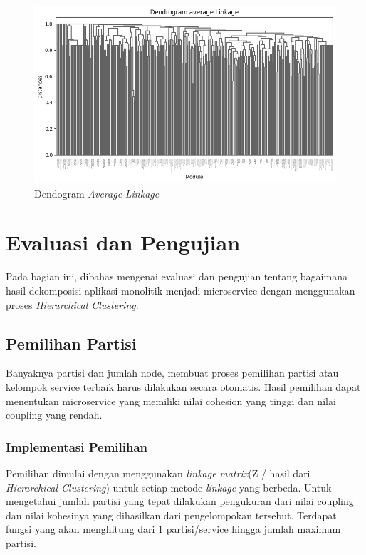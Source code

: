 \begin{figure}[htbp]
	\centering
	\begin{minipage}{1\textwidth}
		\centering
		\includegraphics[width=1\textwidth]{img/bab_4/avg_dd.png}
		\caption{Dendogram \textit{Average} \textit{Linkage} }
		\label{fig:dd_avg}
	\end{minipage}\hfill	
\end{figure}

\pagebreak


\section{Evaluasi dan Pengujian}
Pada bagian ini, dibahas mengenai evaluasi dan pengujian tentang bagaimana hasil dekomposisi aplikasi monolitik menjadi microservice dengan menggunakan proses \textit{Hierarchical Clustering}.

\subsection{Pemilihan Partisi}
Banyaknya partisi dan jumlah node, membuat proses pemilihan partisi atau kelompok service terbaik harus dilakukan secara otomatis. Hasil pemilihan dapat menentukan microservice yang memiliki nilai cohesion yang tinggi dan nilai coupling yang rendah.

\subsubsection{Implementasi Pemilihan}
  Pemilihan dimulai dengan menggunakan \textit{linkage} \textit{matrix}(Z / hasil dari \textit{Hierarchical Clustering}) untuk setiap metode \textit{linkage} yang berbeda. Untuk mengetahui jumlah partisi yang tepat dilakukan pengukuran dari nilai coupling dan nilai kohesinya yang dihasilkan dari pengelompokan tersebut. Terdapat fungsi yang akan menghitung dari 1 partisi/service hingga jumlah maximum partisi.


